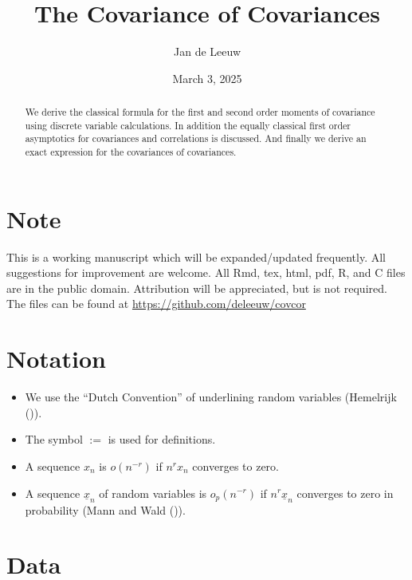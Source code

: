 \documentclass[
  12pt,
  letterpaper,
  DIV=11,
  numbers=noendperiod]{scrartcl}
\title{The Covariance of Covariances}
\author{Jan de Leeuw}
\date{March 3, 2025}
\providecommand{\tightlist}{%
  \setlength{\itemsep}{0pt}\setlength{\parskip}{0pt}}\usepackage{longtable,booktabs,array}
\newcommand{\sectionbreak}{\clearpage}
\newcommand{\ul}[1]{\underline{#1}}
\renewcommand*\contentsname{Table of contents}
\newcommand\contentsname{Table of contents}
\begin{document}
\maketitle
\begin{abstract}
We derive the classical formula for the first and second order moments
of covariance using discrete variable calculations. In addition the
equally classical first order asymptotics for covariances and
correlations is discussed. And finally we derive an exact expression for
the covariances of covariances.
\end{abstract}

\renewcommand*\contentsname{Table of contents}
{
\hypersetup{linkcolor=}
\setcounter{tocdepth}{3}
\tableofcontents
}

\sectionbreak

\section*{Note}\label{note}

This is a working manuscript which will be expanded/updated frequently.
All suggestions for improvement are welcome. All Rmd, tex, html, pdf, R,
and C files are in the public domain. Attribution will be appreciated,
but is not required. The files can be found at
\url{https://github.com/deleeuw/covcor}

\section*{Notation}\label{notation}

\begin{itemize}
\tightlist
\item
  We use the ``Dutch Convention'' of underlining random variables
  (Hemelrijk ()).
\item
  The symbol \(:=\) is used for definitions.
\item
  A sequence \(x_n\) is \(o(n^{-r})\) if \(n^rx_n\) converges to zero.
\item
  A sequence \(\ul{x}_n\) of random variables is \(o_p(n^{-r})\) if
  \(n^r\ul{x}_n\) converges to zero in probability (Mann and Wald
  ()).
\end{itemize}

\sectionbreak

\section{Data}\label{data}
\end{document}
